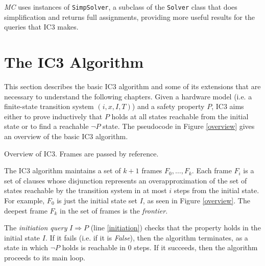 \documentclass[12pt,a4paper,twoside,openright]{report}
\begin{document}
{{\emph{MC} uses instances of \verb,SimpSolver,, a subclass of the \verb,Solver, class
that does simplification and returns full assignments, providing more useful results
for the queries that IC3 makes.

\section{The IC3 Algorithm}
\label{prep:ic3}
This section describes the basic IC3 algorithm and some of its extensions that are
necessary to understand the following chapters.
Given a hardware model (i.e. a finite-state transition system $(i,x,I,T)$) and a
safety property $P$, IC3 aims either to prove inductively that $P$ holds
at all states reachable from the initial state or
to find a reachable $\neg P$ state.
The pseudocode in Figure \ref{overview} gives an overview of the basic IC3 algorithm.	

\begin{algorithm}[t]
\DontPrintSemicolon
{}
\caption{Overview of IC3. Frames are passed by reference.}
\label{overview}
\end{algorithm}

The IC3 algorithm maintains a set of $k + 1$ frames $F_0,\ldots,F_k$.
Each frame $F_i$ is a set of clauses whose disjunction represents an
overapproximation of the set of states reachable by the transition
system in at most $i$ steps from the initial state.
For example, $F_0$ is just the initial state set $I$, as seen
in Figure \ref{overview}.
The deepest frame $F_k$ in the set of frames is the \emph{frontier}.

The \emph{initiation query} $I \Rightarrow P$ (line \ref{initiation}) checks that
the property holds in the initial state $I$.
If it fails (i.e. if it is {\it False}), then the algorithm terminates,
as a state in which $\neg P$ holds is reachable in 0 steps.
If it succeeds, then the algorithm proceeds to its main loop.

}}
\end{document}
